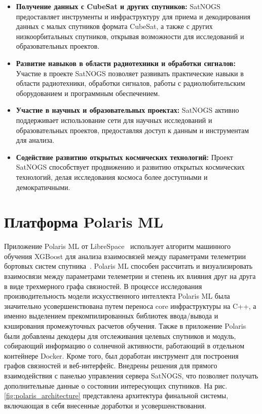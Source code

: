 \documentclass[14pt, a4paper]{extreport}
\begin{document}
    \begin{itemize}
        \item \textbf{Получение данных с CubeSat и других спутников:} SatNOGS предоставляет инструменты и инфраструктуру для приема и декодирования данных с малых спутников формата CubeSat, а также с других низкоорбитальных спутников,  открывая возможности для исследований и образовательных проектов.
        \item \textbf{Развитие навыков в области радиотехники и обработки сигналов:} Участие в проекте SatNOGS позволяет развивать практические навыки в области радиотехники, обработки сигналов, работы с радиолюбительским оборудованием и программным обеспечением.
        \item \textbf{Участие в научных и образовательных проектах:} SatNOGS активно поддерживает использование сети для научных исследований и образовательных проектов, предоставляя доступ к данным и инструментам для анализа.
        \item \textbf{Содействие развитию открытых космических технологий:} Проект SatNOGS способствует продвижению и развитию открытых космических технологий, делая исследования космоса более доступными и демократичными.
    \end{itemize}

    \newpage


    \section{Платформа Polaris ML}

    Приложение Polaris ML от LibreSpace~\cite{librespace_docs} использует алгоритм машинного обучения XGBoost для анализа взаимосвязей между параметрами телеметрии бортовых систем спутника~\cite{ray_2002_bayesian}.
    Polaris ML способен рассчитать и визуализировать взаимосвязи между параметрами телеметрии и степень их влияния друг на друга в виде трехмерного графа связностей.
    В процессе исследования производительность модели искусственного интеллекта Polaris ML была значительно усовершенствована путем переноса core инфраструктуры на C++, а именно выделением прекомпилированных библиотек ввода/вывода и кэширования промежуточных расчетов обучения.
    Также в приложение Polaris были добавлены декодеры для отслеживания целевых спутников и модуль, собирающий информацию о солнечной активности, работающий в отдельном контейнере Docker.
    Кроме того, был доработан инструмент для построения графов связностей и веб-интерфейс.
    Внедрены решения для прямого взаимодействия с панелью управления сервера SatNOGS, что позволяет получать дополнительные данные о состоянии интересующих спутников.
    На рис. \ref{fig:polaris_architecture} представлена архитектура финальной системы, включающая в себя внесенные доработки и усовершенствования.
\end{document}
